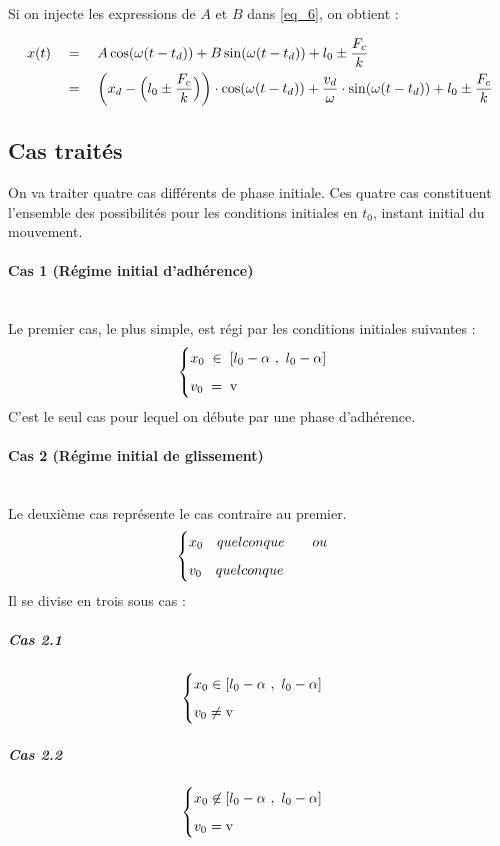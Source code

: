 \documentclass{article}
\begin{document}
Si on injecte les expressions de $A$ et $B$ dans \eqref{eq_6}, on obtient :

\begin{align}
	x(t) \quad&=\quad A\cos(\omega (t-t_d))+B\sin(\omega (t-t_d))+ l_0 \pm \dfrac{F_c}{k} \nonumber \\
	&= \quad\left(x_d - \Big{(}l_0 \pm \dfrac{F_c}{k}\Big{)}\right)\cdot\cos(\omega (t-t_d)) +\dfrac{v_d}{\omega}\cdot\sin(\omega (t-t_d)) + l_0 \pm \dfrac{F_c}{k}\addtocounter{equation}{2} \label{eq_7}
\end{align}

\subsection{Cas traités}\label{ssec_1.2}
On va traiter quatre cas différents de phase initiale. Ces quatre cas constituent l'ensemble des possibilités pour les conditions initiales en $t_0$, instant initial du mouvement.  
\paragraph{Cas 1 (Régime initial d'adhérence)}\label{par_1.2.0.1}
\mbox{}\\
Le premier cas, le plus simple, est régi par les conditions initiales suivantes :
$$
\begin{cases}
	\vspace{.2cm}
	x_0\;\in\; [l_0-\alpha~,~l_0-\alpha]\\
	v_0 \;=\; \text{v}
\end{cases}
$$
C'est le seul cas pour lequel on débute par une phase d'adhérence. 

\paragraph{Cas 2 (Régime initial de glissement)}\label{par_1.2.0.4}
\mbox{}\\
Le deuxième cas représente le cas contraire au premier.$$
\begin{cases}
	\vspace{.2cm}
	x_0 \quad\text\small{quelconque}\qquad \text\small{ou}\\
	v_0 \quad\text\small{quelconque}
\end{cases}
$$
Il se divise en trois sous cas :
\subparagraph{Cas 2.1}
$$
\begin{cases}
	\vspace{.2cm}
	x_0  \in [l_0-\alpha~,~l_0-\alpha]\\
	v_0 \neq \text{v}
\end{cases}
$$
\subparagraph{Cas 2.2}
$$
\begin{cases}
	\vspace{.2cm}
	x_0  \not\in [l_0-\alpha~,~l_0-\alpha]\\
	v_0 = \text{v}
\end{cases}
$$
\end{document}
